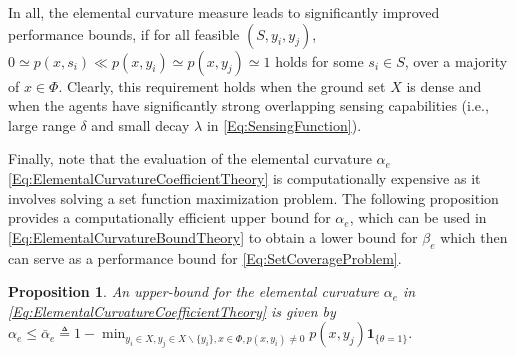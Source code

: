 \documentclass[letterpaper, 10 pt, conference]{ieeeconf}
\newcommand{\mb}[1]{\mathbf{#1}}
\newtheorem{proposition}{Proposition}
\begin{document}
In all, the elemental curvature measure leads to significantly improved performance bounds, if for all feasible $(S,y_i,y_j)$, 
$
0 \simeq p(x,s_i) \ll p(x,y_i) \simeq p(x,y_j) \simeq 1
$
holds for some $s_i \in S$, over a majority of $x\in\Phi$. Clearly, this requirement holds when the ground set $X$ is dense and when the agents have significantly strong overlapping sensing capabilities (i.e., large range $\delta$ and small decay $\lambda$ in \eqref{Eq:SensingFunction}). 

Finally, note that the evaluation of the elemental curvature $\alpha_e$ \eqref{Eq:ElementalCurvatureCoefficientTheory} is computationally expensive as it involves solving a set function maximization problem. The following proposition provides a computationally efficient upper bound for $\alpha_e$, which can be used in \eqref{Eq:ElementalCurvatureBoundTheory} to obtain a lower bound for $\beta_e$ which then can serve as a performance bound for \eqref{Eq:SetCoverageProblem}. 



\begin{proposition}
\label{Pr:ElementalCurvatureBound}
An upper-bound for the elemental curvature $\alpha_e$ in \eqref{Eq:ElementalCurvatureCoefficientTheory} is given by 
$
\alpha_e \leq \bar{\alpha}_e \triangleq
1-\min_{y_i\in X, y_j \in X\backslash\{y_i\},x\in \Phi, p(x,y_i) \neq 0} p(x,y_j)\mb{1}_{\{\theta =1\}}.
$
\end{proposition}
\end{document}
